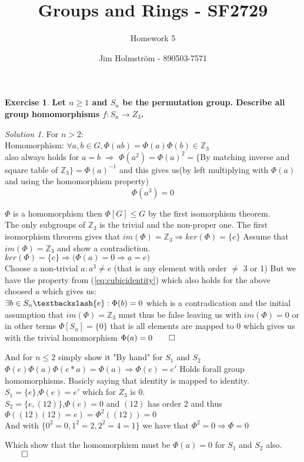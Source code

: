 \documentclass[a4paper,twoside=false,abstract=false,numbers=noenddot,
titlepage=false,headings=small,parskip=half,version=last]{scrartcl}
\author{Jim Holmström - 890503-7571}
\title{Groups and Rings - SF2729}
\subtitle{Homework 5}
\theoremstyle{definition}
\newtheorem{exercise}{Exercise}
\theoremstyle{remark}
\newtheorem*{solution}{Solution}
\newcommand{\ZZ}{\ensuremath{\mathbb{Z}}}
\begin{document}
\maketitle
\thispagestyle{empty}

\begin{exercise}
{\bf
Let $n \ge 1$ and $S_n$ be the permutation group. 
Describe all group homomorphisms $f : S_n \rightarrow Z_3$.
}
\end{exercise}
\begin{solution}

For $n>2$:\\

Homomorphism: $\forall a,b \in G, \Phi(ab)=\Phi(a)\Phi(b) \in \ZZ_3$\\
also always holds for $a=b$ $\Rightarrow$ $\Phi(a^2)=\Phi(a)^2=\{$By matching inverse and square table of $\ZZ_3\}=\Phi(a)^{-1}$ 
and this gives us(by left multiplying with $\Phi(a)$ and using the homomorphism property)
\begin{equation}
\label{eq:cubicidentity}
    \Phi(a^3)=0
\end{equation}


$\Phi$ is a homomorphism then $\Phi \left[ G \right] \le G$ by the first isomorphism theorem.\\
The only subgroups of $\ZZ_3$ is the trivial and the non-proper one.
The first isomorphism theorem gives that $im(\Phi)=\ZZ_3 \Rightarrow ker(\Phi)=\{e\}$
Assume that $im(\Phi)=\ZZ_3$ and show a contradiction.\\
$ker(\Phi)=\{e\} \Rightarrow \bigg( \Phi(a)=0 \Rightarrow a=e \bigg)$\\
Choose a non-trivial $a : a^3 \neq e$ (that is any element with order $\neq$ 3 or 1)
But we have the property from (\ref{eq:cubicidentity}) which also holds for the above choosed $a$ which gives us:\\
$\exists b \in S_n \textbackslash \{e\} : \Phi(b)=0$ which is a contradication and the initial assumption that $im(\Phi)=\ZZ_3$ must thus be false leaving us with 
$im(\Phi)={0}$ or in other terms $\Phi \left[ S_n \right]=\{0\}$ that is all elements are mapped to $0$ which gives us with the trivial homomorphism $\Phi(a)=0 \qed$

And for $n \le 2$ simply show it "By hand" for $S_1$ and $S_2$\\

$\Phi(e)\Phi(a)\Phi(e*a)=\Phi(a) \Rightarrow \Phi(e)=e'$ Holds forall group
homomorphisms. Basicly saying that identity is mapped to identity.\\
$S_1=\{e\}$,$\Phi(e)=e'$ which for $Z_3$ is 0. \\
$S_2=\{e,(1 2)\}$,$\Phi(e)=0$ and $(1 2)$ has order 2 and thus $\Phi((1 2)(1
2)=e)=\Phi^2((1 2))=0$\\
And with $\{0^2=0,1^2=2,2^2=4=1\}$ we have that $\Phi^2=0 \Rightarrow \Phi=0$

Which show that the homomorphism must be $\Phi(a)=0$ for $S_1$ and $S_2$ also.
$\qed$

\end{solution}
\end{document}

